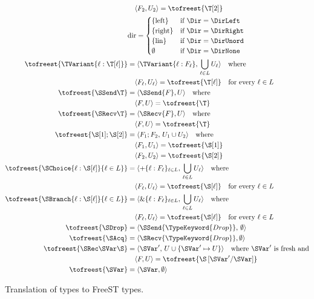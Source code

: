 \begin{figure}[tp]
\begin{align*}
      & \quad \langle F_2, U_2 \rangle = \tofreest{\T[2]} \\
      & \text{dir} = \begin{cases}
        \{ \text{left} \} & \text{if } \Dir = \DirLeft \\
        \{ \text{right} \} & \text{if } \Dir = \DirRight \\
        \{ \text{lin} \} & \text{if } \Dir = \DirUnord \\
        \emptyset & \text{if } \Dir = \DirNone
      \end{cases} \\
    \tofreest{\TVariant{\ell:\T[\ell]}}
      & = \langle \TVariant{\ell:F_\ell},\, \bigcup_{\ell\in L} U_\ell \rangle \quad \text{where} \\
      & \quad \langle F_\ell, U_\ell \rangle = \tofreest{\T[\ell]} \quad \text{for every } \ell \in L \\
    \tofreest{\SSend\T}
      & = \langle \SSend{F}, U \rangle \quad \text{where} \\
      & \quad \langle F, U \rangle = \tofreest{\T} \\
    \tofreest{\SRecv\T}
      & = \langle \SRecv{F}, U \rangle \quad \text{where} \\
      & \quad \langle F, U \rangle = \tofreest{\T} \\
    \tofreest{\S[1] ; \S[2]}
      & = \langle F_1 ; F_2,\, U_1 \cup U_2 \rangle \quad \text{where} \\
      & \quad \langle F_1, U_1 \rangle = \tofreest{\S[1]} \\
      & \quad \langle F_2, U_2 \rangle = \tofreest{\S[2]} \\
    \tofreest{\SChoice{\ell:\S[\ell]}{\ell\in L}}
      & = \langle +\{\ell : F_\ell\}_{\ell\in L},\, \bigcup_{\ell\in L} U_\ell \rangle \quad \text{where} \\
      & \quad \langle F_\ell, U_\ell \rangle = \tofreest{\S[\ell]} \quad \text{for every } \ell \in L \\
    \tofreest{\SBranch{\ell:\S[\ell]}{\ell\in L}}
      & = \langle \&\{\ell : F_\ell\}_{\ell\in L},\, \bigcup_{\ell\in L} U_\ell \rangle \quad \text{where} \\
      & \quad \langle F_\ell, U_\ell \rangle = \tofreest{\S[\ell]} \quad \text{for every } \ell \in L \\
    \tofreest{\SDrop}
      & = \langle \SSend{\TypeKeyword{Drop}},\, \emptyset \rangle \\
    \tofreest{\SAcq}
      & = \langle \SRecv{\TypeKeyword{Drop}}, \emptyset \rangle \\
    \tofreest{\SRec\SVar\S}
      & = \langle \SVar',\, U \cup \{\SVar' \mapsto U\} \rangle \quad \text{where } \SVar' \text{ is fresh and} \\
      & \quad \langle F, U \rangle = \tofreest{\S\,[\SVar'/\SVar]} \\
    \tofreest{\SVar}
      & = \langle \SVar, \emptyset \rangle
  \end{align*}
  \caption{Translation of types to FreeST types.}
  \label{fig:freest-translation}
\end{figure}

